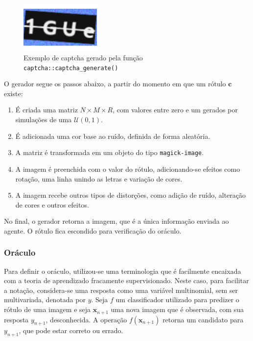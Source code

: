 \documentclass[12pt,twoside,brazilian]{book}
\providecommand{\tightlist}{%
  \setlength{\itemsep}{0pt}\setlength{\parskip}{0pt}}
\begin{document}
\begin{figure}

{\centering \includegraphics[width=1.5625in,height=\textheight]{./metodologia_files/figure-pdf/fig-captcha-r-exemplo-1.pdf}

}

\caption{\label{fig-captcha-r-exemplo}Exemplo de captcha gerado pela
função \texttt{captcha::captcha\_generate()}}

\end{figure}

O gerador segue os passos abaixo, a partir do momento em que um rótulo
\(\mathbf c\) existe:

\begin{enumerate}
\def\labelenumi{\arabic{enumi}.}
\tightlist
\item
  É criada uma matriz \(N\times M \times R\), com valores entre zero e
  um gerados por simulações de uma \(\mathcal U(0,1)\).
\item
  É adicionada uma cor base ao ruído, definida de forma aleatória.
\item
  A matriz é transformada em um objeto do tipo \texttt{magick-image}.
\item
  A imagem é preenchida com o valor do rótulo, adicionando-se efeitos
  como rotação, uma linha unindo as letras e variação de cores.
\item
  A imagem recebe outros tipos de distorções, como adição de ruído,
  alteração de cores e outros efeitos.
\end{enumerate}

No final, o gerador retorna a imagem, que é a única informação enviada
ao agente. O rótulo fica escondido para verificação do oráculo.

\hypertarget{sec-oraculo}{%
\subsubsection{Oráculo}\label{sec-oraculo}}

Para definir o oráculo, utilizou-se uma terminologia que é facilmente
encaixada com a teoria de aprendizado fracamente supervisionado. Neste
caso, para facilitar a notação, considera-se uma resposta como uma
variável multinomial, sem ser multivariada, denotada por \(y\). Seja
\(f\) um classificador utilizado para predizer o rótulo de uma imagem e
seja \(\mathbf x_{n+1}\) uma nova imagem que é observada, com sua
resposta \(y_{n+1}\), desconhecida. A operação \(f(\mathbf x_{n+1})\)
retorna um candidato para \(y_{n+1}\), que pode estar correto ou errado.
\end{document}
